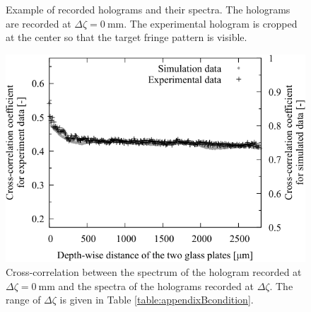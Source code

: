 \begin{figure}[H]
    \caption{Example of recorded holograms and their spectra. The holograms are recorded at $\Delta \zeta = \SI{0}{\mm}$. The experimental hologram is cropped at the center so that the target fringe pattern is visible.} 
    \label{fig:appendixBresult}
\end{figure}

\begin{figure}[H]
    \centering
    \includegraphics[width=0.8\linewidth]{./Figure/7_Appendix/result.pdf}
    \caption{Cross-correlation between the spectrum of the hologram recorded at $\Delta \zeta = \SI{0}{\mm}$ and the spectra of the holograms recorded at $\Delta \zeta$. The range of $\Delta \zeta$ is given in Table \ref{table:appendixBcondition}.}
    \label{fig:appendixBcorrelation}
\end{figure}

